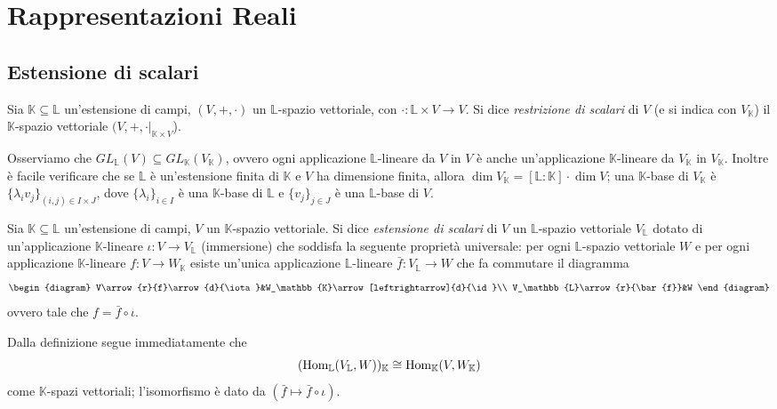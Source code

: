\chapter{Rappresentazioni Reali}

\section{Estensione di scalari}

\begin{definition}
Sia $\mathbb{K}\subseteq\mathbb{L}$ un'estensione di campi, $(V,+,\cdot)$ un $\mathbb{L}$-spazio vettoriale, con $\cdot:\mathbb{L}\times V\to V$. Si dice \emph{restrizione di scalari} di $V$ (e si indica con $V_\mathbb{K}$) il $\mathbb{K}$-spazio vettoriale $(V,+,\cdot|_{\mathbb{K}\times V}$).
\end{definition}

Osserviamo che $GL_{\mathbb{L}}(V)\subseteq GL_{\mathbb{K}}(V_\mathbb{K})$, ovvero ogni applicazione $\mathbb{L}$-lineare da $V$ in $V$ è anche un'applicazione $\mathbb{K}$-lineare da $V_\mathbb{K}$ in $V_\mathbb{K}$. Inoltre è facile verificare che se $\mathbb{L}$ è un'estensione finita di $\mathbb{K}$ e $V$ ha dimensione finita, allora $\dim V_\mathbb{K}=[\mathbb{L}:\mathbb{K}]\cdot\dim{V}$; una $\mathbb{K}$-base di $V_\mathbb{K}$ è $\{\lambda_iv_j\}_{(i,j)\in I\times J}$, dove $\{\lambda_i\}_{i\in I}$ è una $\mathbb{K}$-base di $\mathbb{L}$ e $\{v_j\}_{j\in J}$ è una $\mathbb{L}$-base di $V$.


\begin{definition}
Sia $\mathbb{K}\subseteq\mathbb{L}$ un'estensione di campi, $V$ un $\mathbb{K}$-spazio vettoriale. Si dice \emph{estensione di scalari} di $V$ un $\mathbb{L}$-spazio vettoriale $V_\mathbb{L}$ dotato di un'applicazione $\mathbb{K}$-lineare $\iota:V\to V_\mathbb{L}$ (immersione) che soddisfa la seguente proprietà universale: per ogni $\mathbb{L}$-spazio vettoriale $W$ e per ogni applicazione $\mathbb{K}$-lineare $f:V\to W_\mathbb{K}$ esiste un'unica applicazione $\mathbb{L}$-lineare $\bar{f}:V_\mathbb{L}\to W$ che fa commutare il diagramma
$$
\begin{diagram}
V\arrow{r}{f}\arrow{d}{\iota}&W_\mathbb{K}\arrow[leftrightarrow]{d}{\id}\\
V_\mathbb{L}\arrow{r}{\bar{f}}&W
\end{diagram}
$$
ovvero tale che $f=\bar{f}\circ \iota$.
\end{definition}

Dalla definizione segue immediatamente che
$$
(\operatorname{Hom}_{\mathbb{L}}(V_\mathbb{L}, W))_\mathbb{K}\cong\operatorname{Hom}_{\mathbb{K}}(V,W_\mathbb{K})
$$
come $\mathbb{K}$-spazi vettoriali; l'isomorfismo è dato da $(\bar{f}\mapsto\bar{f}\circ\iota)$.


